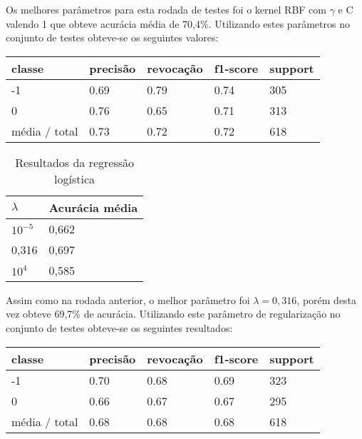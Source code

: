 Os melhores parâmetros para esta rodada de testes foi o kernel RBF com $\gamma$ e C valendo 1 que
obteve acurácia média de 70,4\%. Utilizando estes parâmetros no conjunto de testes obteve-se os
seguintes valores:

\begin{table}[H]
	\centering
		\begin{tabular}{l | l | l | l | l}
		\hline
		classe  	&	precisão  &  revocação &  f1-score &  support \\
		\hline
		 -1    &   0.69   &   0.79   &   0.74   &    305 \\
		 \hline
          0    &   0.76   &   0.65   &   0.71   &    313 \\
		\hline
		média / total   &    0.73   &   0.72   &   0.72   &    618 \\
		\hline
	\end{tabular}
\end{table}

\begin{table}[H]
	\centering
	\caption{Resultados da regressão logística}
	\begin{tabular}{l l}
		\hline
		$\lambda$ & Acurácia média \\
		\hline
		$10^{-5}$ & 0,662 \\
		\hline
		0,316 & 0,697 \\
		\hline
		$10^{4}$ & 0,585 \\
	\end{tabular}
\end{table}

Assim como na rodada anterior, o melhor parâmetro foi $\lambda = 0,316$, porém desta vez obteve
69,7\% de acurácia. Utilizando este parâmetro de regularização no conjunto de testes obteve-se
os seguintes resultados:

\begin{table}[H]
	\centering
		\begin{tabular}{l | l | l | l | l}
		\hline
		classe  	&	precisão  &  revocação &  f1-score &  support \\
		\hline
		 -1    &   0.70   &   0.68   &   0.69   &    323 \\
		 \hline
          0    &   0.66   &   0.67   &   0.67   &    295 \\
		\hline
		média / total   &    0.68   &   0.68   &   0.68   &    618 \\
		\hline
	\end{tabular}
\end{table}

